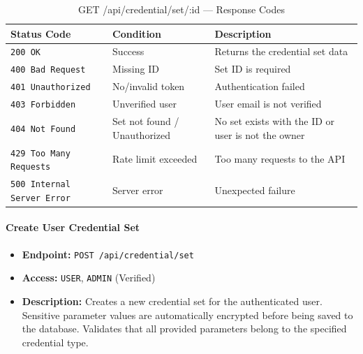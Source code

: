 \begin{table}[H]
\centering
\renewcommand{\arraystretch}{1.3}
\begin{tabularx}{\textwidth}{|l|l|X|}
\hline
\textbf{Status Code} & \textbf{Condition} & \textbf{Description} \\
\hline
\texttt{200 OK}           & Success              & Returns the credential set data \\
\hline
\texttt{400 Bad Request}  & Missing ID           & Set ID is required \\
\hline
\texttt{401 Unauthorized} & No/invalid token     & Authentication failed \\
\hline
\texttt{403 Forbidden}    & Unverified user      & User email is not verified \\
\hline
\texttt{404 Not Found}    & Set not found / Unauthorized & No set exists with the ID or user is not the owner \\
\hline
\texttt{429 Too Many Requests} & Rate limit exceeded & Too many requests to the API \\
\hline
\texttt{500 Internal Server Error} & Server error & Unexpected failure \\
\hline
\end{tabularx}
\caption{GET /api/credential/set/:id — Response Codes}
\label{tab:get-user-credential-set-by-id-responses}
\end{table}
\FloatBarrier

\paragraph{Create User Credential Set}
\label{subsubsec:create-user-credential-set}

\begin{itemize}
  \item \textbf{Endpoint:} \texttt{POST /api/credential/set}
  \item \textbf{Access:} \texttt{USER}, \texttt{ADMIN} (Verified)
  \item \textbf{Description:} Creates a new credential set for the authenticated user.
  Sensitive parameter values are automatically encrypted before being saved to the database.
  Validates that all provided parameters belong to the specified credential type.
\end{itemize}

